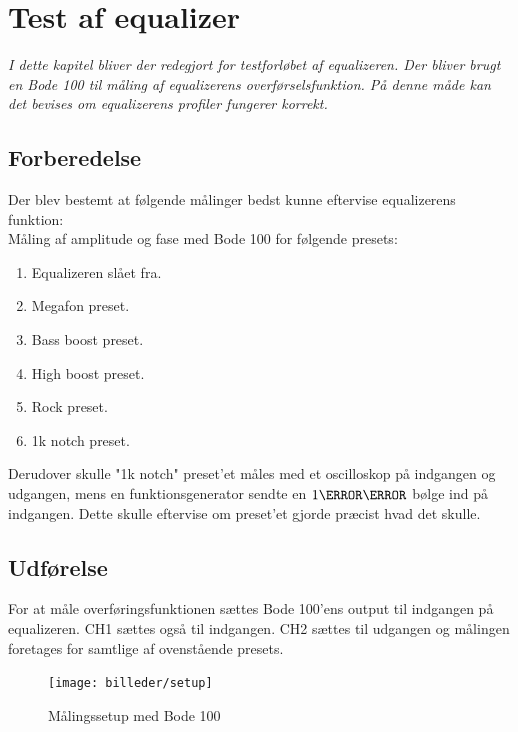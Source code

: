 \chapter{Test af equalizer}\label{sec:test_eq}


\emph{I dette kapitel bliver der redegjort for testforløbet af equalizeren. Der bliver brugt en Bode 100 til måling af equalizerens overførselsfunktion. På denne måde kan det bevises om equalizerens profiler fungerer korrekt.}

\section{Forberedelse}


Der blev bestemt at følgende målinger bedst kunne eftervise equalizerens funktion: \\

Måling af amplitude og fase med Bode 100 for følgende presets:
\begin{enumerate}
    \item Equalizeren slået fra.
    \item Megafon preset.
    \item Bass boost preset.
    \item High boost preset.
    \item Rock preset. 
    \item 1k notch preset. \\
\end{enumerate}
	


Derudover skulle "1k notch" preset'et måles med et oscilloskop på indgangen og udgangen, mens en funktionsgenerator sendte en $1\kilo\hertz$ bølge ind på indgangen. Dette skulle eftervise om preset'et gjorde præcist hvad det skulle. \\


\section{Udførelse}
For at måle overføringsfunktionen sættes Bode 100'ens output til indgangen på equalizeren. CH1 sættes også til indgangen. CH2 sættes til udgangen og målingen foretages for samtlige af ovenstående presets.


\begin{figure}[h!]
	\centering
	\texttt{[image: billeder/setup]}
	\caption{Målingssetup med Bode 100}
\end{figure}	


